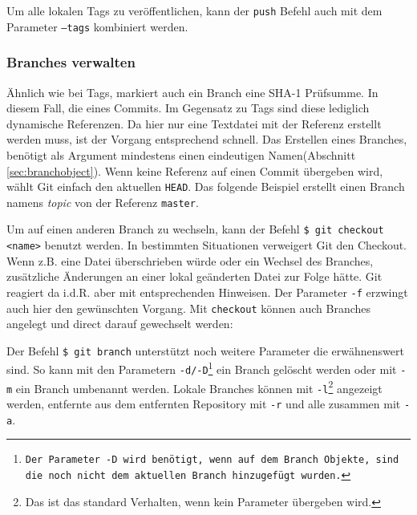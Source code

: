 

Um alle lokalen Tags zu veröffentlichen, kann der \texttt{push} Befehl auch mit
dem Parameter \texttt{--tags} kombiniert werden.\cite[70-71,162-163]{gitosp}



\subsubsection{Branches verwalten} Ähnlich wie bei Tags, markiert auch ein
Branch eine \gls{SHA-1} Prüfsumme. In diesem Fall, die eines Commits. Im
Gegensatz zu Tags sind diese lediglich dynamische Referenzen. Da hier nur eine
Textdatei mit der Referenz erstellt werden muss, ist der Vorgang entsprechend
schnell. Das Erstellen eines Branches, benötigt als Argument mindestens einen
eindeutigen Namen(Abschnitt \ref{sec:branchobject}). Wenn keine Referenz auf
einen Commit übergeben wird, wählt Git einfach den aktuellen \texttt{HEAD}.
Das folgende Beispiel erstellt einen Branch namens \textit{topic} von der
Referenz \texttt{master}.



Um auf einen anderen Branch zu wechseln, kann der Befehl \texttt{\$ git checkout
<name>} benutzt werden. In bestimmten Situationen verweigert Git den Checkout.
Wenn z.B. eine Datei überschrieben würde oder ein Wechsel des Branches, zusätzliche
Änderungen an einer lokal geänderten Datei zur Folge hätte. Git reagiert da
i.d.R. aber mit entsprechenden Hinweisen. Der Parameter \texttt{-f} erzwingt
auch hier den gewünschten Vorgang. Mit \texttt{checkout} können auch Branches
angelegt und direct darauf gewechselt werden:



Der Befehl \texttt{\$ git branch} unterstützt noch weitere Parameter die
erwähnenswert sind. So kann mit den Parametern
\texttt{-d/-D}\footnote{\texttt{Der Parameter -D wird benötigt, wenn auf dem
Branch Objekte, sind die noch nicht dem aktuellen Branch hinzugefügt
wurden.\cite[67]{gitosp}}} ein Branch gelöscht werden oder mit \texttt{-m} ein
Branch umbenannt werden. Lokale Branches können mit \texttt{-l}\footnote{Das
ist das standard Verhalten, wenn kein Parameter übergeben wird.} angezeigt
werden, entfernte aus dem entfernten Repository mit \texttt{-r} und alle
zusammen mit \texttt{-a}.\cite[65-67]{gitosp}

